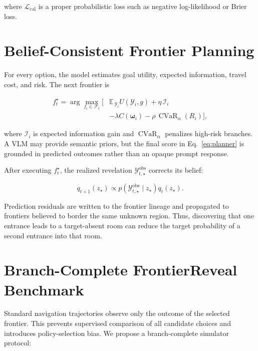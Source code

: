 \documentclass[10pt,twocolumn]{article}
\newcommand{\Frontiers}{\mathcal{F}}
\newcommand{\Reveal}{\mathcal{Y}}
\newcommand{\Option}{\boldsymbol{\omega}}
\newcommand{\Loss}{\mathcal{L}}
\newcommand{\Expect}{\mathbb{E}}
\begin{document}
where \(\Loss_{\mathrm{cal}}\) is a proper probabilistic loss such as negative
log-likelihood or Brier loss.

\section{Belief-Consistent Frontier Planning}

For every option, the model estimates goal utility, expected information,
travel cost, and risk. The next frontier is

\begin{equation}
\begin{aligned}
f_t^\star
=
\arg\max_{f_i\in\Frontiers_t}
\big[
&\Expect_{\,\Reveal_i}U(\Reveal_i,g)
+\eta\,\mathcal{I}_i\\
&-\lambda C(\Option_i)
-\rho\,\operatorname{CVaR}_{\alpha}(R_i)
\big],
\end{aligned}
\label{eq:planner}
\end{equation}

where \(\mathcal{I}_i\) is expected information gain and
\(\operatorname{CVaR}_{\alpha}\) penalizes high-risk branches. A VLM may provide
semantic priors, but the final score in Eq.~\eqref{eq:planner} is grounded in
predicted outcomes rather than an opaque prompt response.

After executing \(f_t^\star\), the realized revelation
\(\Reveal_{t,\star}^{\mathrm{obs}}\) corrects its belief:

\begin{equation}
q_{t+1}(z_\star)
\propto
p
\left(
\Reveal_{t,\star}^{\mathrm{obs}}
\mid z_\star
\right)
q_t(z_\star).
\end{equation}

Prediction residuals are written to the frontier lineage and propagated to
frontiers believed to border the same unknown region. Thus, discovering that
one entrance leads to a target-absent room can reduce the target probability
of a second entrance into that room.

\section{Branch-Complete FrontierReveal Benchmark}

Standard navigation trajectories observe only the outcome of the selected
frontier. This prevents supervised comparison of all candidate choices and
introduces policy-selection bias. We propose a branch-complete simulator
protocol:
\end{document}
